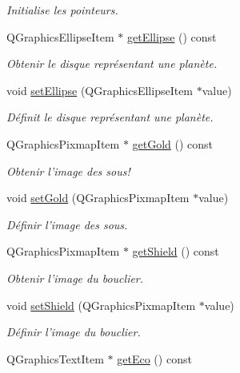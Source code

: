 \begin{DoxyCompactItemize}
\begin{DoxyCompactList}\small\item\em Initialise les pointeurs. \end{DoxyCompactList}\item 
Q\-Graphics\-Ellipse\-Item $\ast$ \hyperlink{classQPlanet_ad8e68b6cbcd2d204324091f10354790a}{get\-Ellipse} () const 
\begin{DoxyCompactList}\small\item\em Obtenir le disque représentant une planète. \end{DoxyCompactList}\item 
void \hyperlink{classQPlanet_aec0bd75b3e991318654da7140e407811}{set\-Ellipse} (Q\-Graphics\-Ellipse\-Item $\ast$value)
\begin{DoxyCompactList}\small\item\em Définit le disque représentant une planète. \end{DoxyCompactList}\item 
Q\-Graphics\-Pixmap\-Item $\ast$ \hyperlink{classQPlanet_a985889ddccdd807db0406845b99d1bbc}{get\-Gold} () const 
\begin{DoxyCompactList}\small\item\em Obtenir l'image des sous! \end{DoxyCompactList}\item 
void \hyperlink{classQPlanet_ac8d32fc63e85ddc719d915cd31db3603}{set\-Gold} (Q\-Graphics\-Pixmap\-Item $\ast$value)
\begin{DoxyCompactList}\small\item\em Définir l'image des sous. \end{DoxyCompactList}\item 
Q\-Graphics\-Pixmap\-Item $\ast$ \hyperlink{classQPlanet_ae42f83965d52ca987d152322354c4509}{get\-Shield} () const 
\begin{DoxyCompactList}\small\item\em Obtenir l'image du bouclier. \end{DoxyCompactList}\item 
void \hyperlink{classQPlanet_acc9badb2a0be0f2daadf5a6ea3fa1878}{set\-Shield} (Q\-Graphics\-Pixmap\-Item $\ast$value)
\begin{DoxyCompactList}\small\item\em Définir l'image du bouclier. \end{DoxyCompactList}\item 
Q\-Graphics\-Text\-Item $\ast$ \hyperlink{classQPlanet_aa9db86548398192009dc3e697c2e353d}{get\-Eco} () const 

\end{DoxyCompactItemize}
